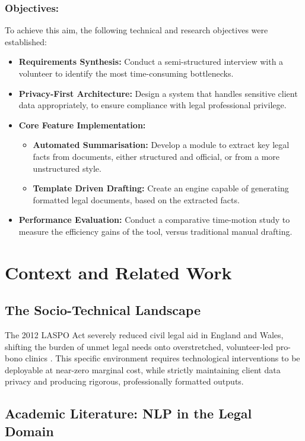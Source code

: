 \documentclass[11pt,a4paper]{article}
\begin{document}
\subsubsection{Objectives:}
To achieve this aim, the following technical and research objectives were established:
\begin{itemize}
    \item \textbf{Requirements Synthesis:} Conduct a semi-structured interview with a volunteer to identify the most time-consuming bottlenecks.
    \item \textbf{Privacy-First Architecture:} Design a system that handles sensitive client data appropriately, to ensure compliance with legal professional privilege.
    \item \textbf{Core Feature Implementation:} \begin{itemize}
        \item \textbf{Automated Summarisation:} Develop a module to extract key legal facts from documents, either structured and official, or from a more unstructured style.
        \item \textbf{Template Driven Drafting:} Create an engine capable of generating formatted legal documents, based on the extracted facts.
    \end{itemize}
    \item \textbf{Performance Evaluation:} Conduct a comparative time-motion study to measure the efficiency gains of the tool, versus traditional manual drafting.
\end{itemize}


\section{Context and Related Work}
\label{sec:context}

\subsection{The Socio-Technical Landscape}

The 2012 LASPO Act severely reduced civil legal aid in England and Wales, shifting the burden of unmet legal needs onto overstretched, volunteer-led pro-bono clinics \cite{laspo2012,moj_laspo_pir2019,laa2023}. This specific environment requires technological interventions to be deployable at near-zero marginal cost, while strictly maintaining client data privacy and producing rigorous, professionally formatted outputs.

\subsection{Academic Literature: NLP in the Legal Domain}
\end{document}
